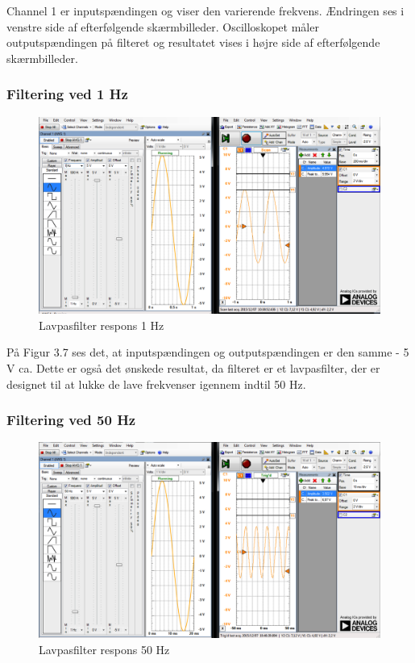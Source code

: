 Channel 1 er inputspændingen og viser den varierende frekvens. Ændringen ses i venstre side af efterfølgende skærmbilleder. 
Oscilloskopet måler outputspændingen på filteret og resultatet vises i højre side af efterfølgende skærmbilleder.

\subsubsection{Filtering ved 1 Hz}
\begin{figure}[H]
	\centering
	\includegraphics[width=1\textwidth]{Figurer/Snip20151207_39}
	\caption{Lavpasfilter respons 1 Hz}
	\label{fig:Filter}
\end{figure}

På Figur 3.7 ses det, at inputspændingen  og outputspændingen er den samme - 5 V ca. Dette er også det ønskede resultat, da filteret er et lavpasfilter, der er designet til at lukke de lave frekvenser igennem indtil 50 Hz. 
 
\subsubsection{Filtering ved 50 Hz}
\begin{figure}[H]
	\centering
	\includegraphics[width=1\textwidth]{Figurer/Snip20151207_40}
	\caption{Lavpasfilter respons 50 Hz}
	\label{fig:Filter}
\end{figure}

